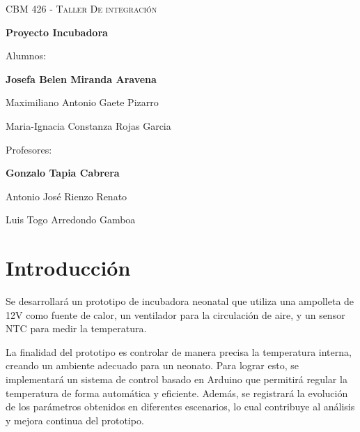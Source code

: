 \documentclass[spanish, a4paper, 11pt]{article}
\begin{document}
\thispagestyle{unicamp}

\begin{center}

	\null\vfill

	{\scshape\large CBM 426 - Taller De integración\par}

	\baselineskip

	{\LARGE\bfseries Proyecto Incubadora\par}

	\baselineskip

	Alumnos:\\[1ex]
	{\large\bfseries Josefa Belen Miranda Aravena

	Maximiliano Antonio Gaete Pizarro

	Maria-Ignacia Constanza Rojas Garcia \par}

	\baselineskip

	Profesores:\\[1ex]
	{\large\bfseries Gonzalo Tapia Cabrera

	Antonio José Rienzo Renato

	Luis Togo Arredondo Gamboa\par}

\end{center}

\vfill




\newpage

\onehalfspacing

\tableofcontents

\newpage

\section{Introducción}

Se desarrollará un prototipo de incubadora neonatal que utiliza una ampolleta de 12V como fuente de calor, un ventilador para la circulación de aire, y un sensor NTC para medir la temperatura. 

La finalidad del prototipo es controlar de manera precisa la temperatura interna, creando un ambiente adecuado para un neonato. Para lograr esto, se implementará un sistema de control basado en Arduino que permitirá regular la temperatura de forma automática y eficiente. Además, se registrará la evolución de los parámetros obtenidos en diferentes escenarios, lo cual contribuye al análisis y mejora continua del prototipo.\par
\end{document}
